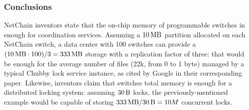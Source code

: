 \subsubsection{Conclusions}
NetChain \cite{netchain} inventors state that the on-chip memory of programmable switches in enough for coordination services.
Assuming a $\SI{10}{\mega\byte}$ partition allocated on each NetChain \cite{netchain} switch, a data center with 100 switches can provide a $(\SI{10}{\mega\byte} \cdot 100) / 3 = \SI{333}{\mega\byte}$ storage with a replication factor of three: that would be enough for the average number of files (22k, from 0 to 1 byte) managed by a typical Chubby \cite{chubby} lock service instance, as cited by Google in their corresponding paper.
Likewise, inventors claim that switches total memory is enough for a distributed locking system: assuming $\SI{30}{\byte}$ locks, the previously-mentioned example would be capable of storing $\SI{333}{\mega\byte} / \SI{30}{\byte} = 10M$ concurrent locks.
